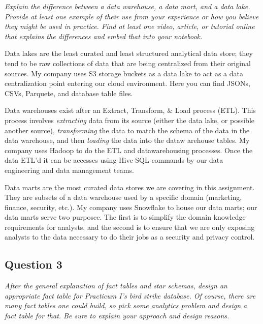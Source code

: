 \documentclass[
]{article}
\begin{document}
\emph{Explain the difference between a data warehouse, a data mart, and
a data lake. Provide at least one example of their use from your
experience or how you believe they might be used in practice. Find at
least one video, article, or tutorial online that explains the
differences and embed that into your notebook.}

Data lakes are the least curated and least structured analytical data
store; they tend to be raw collections of data that are being
centralized from their original sources. My company uses S3 storage
buckets as a data lake to act as a data centralization point entering
our cloud environment. Here you can find JSONs, CSVs, Parquete, and
database table files.

Data warehouses exist after an Extract, Transform, \& Load process
(ETL). This process involves \emph{extracting} data from its source
(either the data lake, or possible another source), \emph{transforming}
the data to match the schema of the data in the data warehouse, and then
\emph{loading} the data into the dataw arehouse tables. My company uses
Hadoop to do the ETL and datawarehousing processes. Once the data ETL'd
it can be accesses using Hive SQL commands by our data engineering and
data management teams.

Data marts are the most curated data stores we are covering in this
assignment. They are subsets of a data warehouse used by a specific
domain (marketing, finance, security, etc.). My company uses Snowflake
to house our data marts; our data marts serve two purposee. The first is
to simplify the domain knowledge requirements for analysts, and the
second is to ensure that we are only exposing analysts to the data
necessary to do their jobs as a security and privacy control.

\hypertarget{question-3}{%
\subsection{Question 3}\label{question-3}}

\emph{After the general explanation of fact tables and star schemas,
design an appropriate fact table for Practicum I's bird strike database.
Of course, there are many fact tables one could build, so pick some
analytics problem and design a fact table for that. Be sure to explain
your approach and design reasons.}
\end{document}
